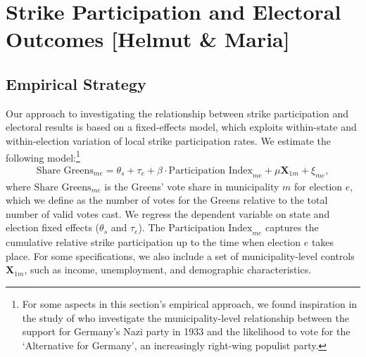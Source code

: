 \clearpage
\section{Strike Participation and Electoral Outcomes [Helmut \& Maria]}\label{sec_greta_cons:strike_participation_elections}



\subsection{Empirical Strategy}


Our approach to investigating the relationship between strike participation and electoral results is based on a fixed-effects model, which exploits within-state and within-election variation of local strike participation rates. We estimate the following model:\footnote{For some aspects in this section's empirical approach, we found inspiration in the study of \cite{cantoni2020persistence} who investigate the municipality-level relationship between the support for Germany's Nazi party in 1933 and the likelihood to vote for the `Alternative for Germany', an increasingly right-wing populist party.}
\begin{align}
	\text{Share Greens}_{me} = \theta_s + \tau_e + \beta\cdot\text{Participation Index}_{me} + \mu \mathbf{X}_{1m} + \xi_{me},\label{eq_greta_cons:vote_share_greens}
\end{align}
where $\text{Share Greens}_{me}$ is the Greens' vote share in municipality $m$ for election $e$, which we define as the number of votes for the Greens relative to the total number of valid votes cast. We regress the dependent variable on state and election fixed effects ($\theta_s$ and $\tau_e$). The $\text{Participation Index}_{me}$ captures the cumulative relative strike participation up to the time when election $e$ takes place. For some specifications, we also include a set of municipality-level controls $\mathbf{X}_{1m}$, such as income, unemployment, and demographic characteristics. 


